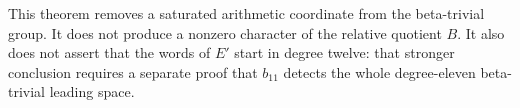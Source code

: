 \begin{remark}\label{rem:eleven-mixed-scope}
This theorem removes a saturated arithmetic coordinate from the
beta-trivial group. It does not produce a nonzero character of the
relative quotient $B$. It also does not assert that the words of
$E'$ start in degree twelve: that stronger conclusion requires a
separate proof that $b_{11}$ detects the whole degree-eleven
beta-trivial leading space.
\end{remark}
